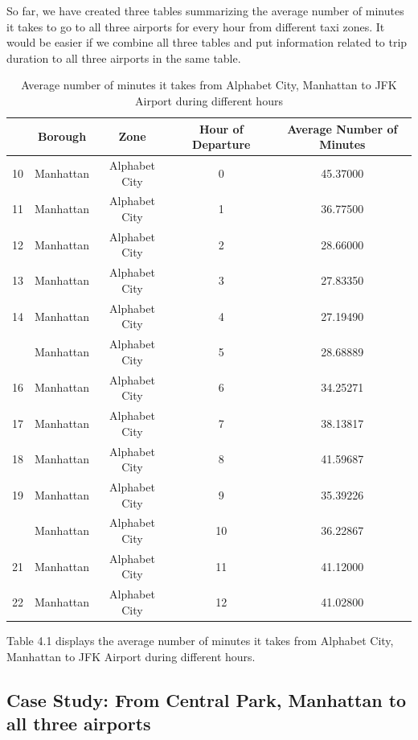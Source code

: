 \documentclass[12pt,twoside]{reedthesis}
\theoremstyle{definition}
\theoremstyle{definition}
\theoremstyle{definition}
\theoremstyle{remark}
\begin{document}
So far, we have created three tables summarizing the average number of
minutes it takes to go to all three airports for every hour from
different taxi zones. It would be easier if we combine all three tables
and put information related to trip duration to all three airports in
the same table.
\begin{table}

\caption{\label{tab:unnamed-chunk-56}Average number of minutes it takes from Alphabet City, Manhattan to JFK Airport during different hours}
\centering
\begin{tabular}[t]{lcccc}
\toprule
  & Borough & Zone & Hour of Departure & Average Number of Minutes\\
\midrule
10 & Manhattan & Alphabet City & 0 & 45.37000\\
11 & Manhattan & Alphabet City & 1 & 36.77500\\
12 & Manhattan & Alphabet City & 2 & 28.66000\\
13 & Manhattan & Alphabet City & 3 & 27.83350\\
14 & Manhattan & Alphabet City & 4 & 27.19490\\
\addlinespace
15 & Manhattan & Alphabet City & 5 & 28.68889\\
16 & Manhattan & Alphabet City & 6 & 34.25271\\
17 & Manhattan & Alphabet City & 7 & 38.13817\\
18 & Manhattan & Alphabet City & 8 & 41.59687\\
19 & Manhattan & Alphabet City & 9 & 35.39226\\
\addlinespace
20 & Manhattan & Alphabet City & 10 & 36.22867\\
21 & Manhattan & Alphabet City & 11 & 41.12000\\
22 & Manhattan & Alphabet City & 12 & 41.02800\\
\bottomrule
\end{tabular}
\end{table}
Table 4.1 displays the average number of minutes it takes from Alphabet
City, Manhattan to JFK Airport during different hours.

\subsection{Case Study: From Central Park, Manhattan to all three
airports}\label{case-study-from-central-park-manhattan-to-all-three-airports}
\end{document}
